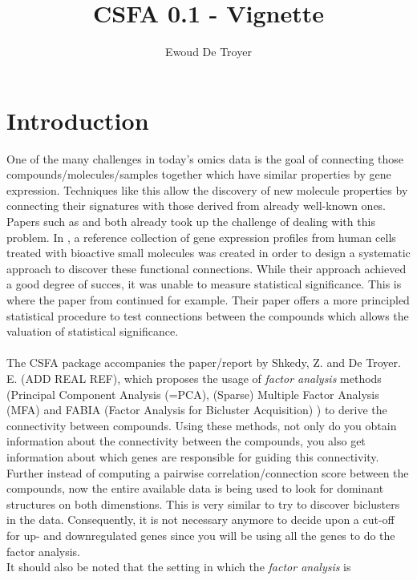 \documentclass[a4paper]{article}\usepackage[]{graphicx}\usepackage[]{color}
\title{CSFA 0.1 - Vignette}
\date{}
\author{Ewoud De Troyer}
\begin{document}
\maketitle
\section{Introduction}

One of the many challenges in today's omics data is the goal of connecting those
compounds/molecules/samples together which have similar properties by gene
expression.
Techniques like this allow the discovery of new molecule properties by
connecting their signatures with those derived from already well-known ones.\\
Papers such as \citet{Lamb2006} and \citet{Zhang2008} both already took up the
challenge of dealing with this problem. In \citet{Lamb2006}, a reference
collection of gene expression profiles from human cells treated with bioactive
small molecules was created in order to design a systematic approach to discover
these functional connections. While their approach achieved a good degree of
succes, it was unable to measure statistical significance. This is where the
paper from \citet{Zhang2008} continued for example. Their paper offers a more
principled statistical procedure to test connections between the compounds which allows the valuation of statistical significance.
\\ \\
The CSFA package accompanies the paper/report by Shkedy, Z. and De Troyer. E. (ADD REAL REF),
which proposes the usage of {\it factor analysis} methods (Principal Component
Analysis (=PCA), (Sparse) Multiple Factor Analysis (MFA) \citep{Abdi2013} and
FABIA (Factor Analysis for Bicluster Acquisition) \citep{Hochreiter2010}) to
derive the connectivity between compounds.
Using these methods, not only do you obtain information about the connectivity between the compounds, you also get
information about which genes are responsible for guiding this connectivity.\\
Further instead of computing a pairwise correlation/connection score between the
compounds, now the entire available data is being used to look for dominant structures on both dimenstions. This is very similar to try to discover biclusters in the data. Consequently, it is not necessary anymore to decide upon a cut-off for up- and downregulated genes since you will be using all the genes to do the factor analysis.
\\
It should also be noted that the setting in which the {\it factor analysis} is
\end{document}
